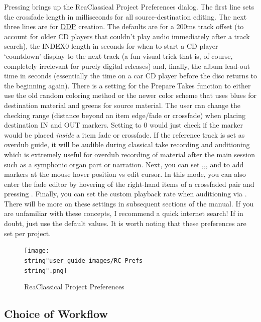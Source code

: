 \documentclass[10pt,american]{article}
\begin{document}
Pressing  brings up the ReaClassical Project Preferences dialog. The
first line sets the crossfade length in milliseconds for all source-destination
editing. The next three lines are for
\href{https://en.wikipedia.org/wiki/Disc_Description_Protocol}{DDP} creation.
The defaults are for a 200ms track offset (to account for older CD players that
couldn't play audio immediately after a track search), the INDEX0 length in
seconds for when to start a CD player `countdown' display to the next track (a
fun visual trick that is, of course, completely irrelevant for purely digital
releases) and, finally, the album lead-out time in seconds (essentially the time
on a car CD player before the disc returns to the beginning again). There is a
setting for the Prepare Takes function to either use the old random coloring
method or the newer color scheme that uses blues for destination material and
greens for source material. The user can change the checking range (distance
beyond an item edge/fade or crossfade) when placing destination IN and OUT
markers. Setting to 0 would just check if the marker would be placed
\emph{inside} a item fade or crossfade. If the reference track is set as overdub
guide, it will be audible during classical take recording and auditioning which
is extremely useful for overdub recording of material after the main session
such as a symphonic organ part or narration. Next, you can set
,,, and  to add markers at the mouse hover
position vs edit cursor. In this mode, you can also enter the fade editor by
hovering of the right-hand items of a crossfaded pair and pressing .
Finally, you can set the custom playback rate when auditioning via
. There will be more on these settings in subsequent sections of
the manual. If you are unfamiliar with these concepts, I recommend a quick
internet search! If in doubt, just use the default values. It is worth noting
that these preferences are set per project.

\begin{figure}
\begin{centering}
\texttt{[image: \\string"user\_guide\_images/RC Prefs\\string".png]}
\par\end{centering}
\caption{ReaClassical Project Preferences}
\end{figure}


\subsection{Choice of Workflow}
\end{document}
